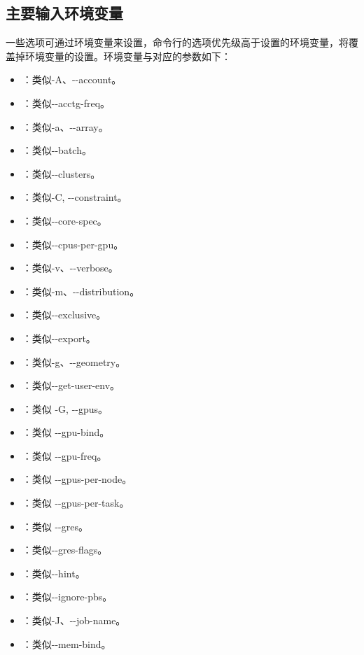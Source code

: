 \subsection{主要输入环境变量}
一些选项可通过环境变量来设置，命令行的选项优先级高于设置的环境变量，将覆盖掉环境变量的设置。环境变量与对应的参数如下：
\begin{itemize}
	\item {}：类似-A、-{}-account。
	\item {}：类似-{}-acctg-freq。
	\item {}：类似-a、-{}-array。
	\item {}：类似-{}-batch。
	\item {}：类似-{}-clusters。
	\item {}：类似-C, -{}-constraint。
	\item {}：类似-{}-core-spec。
	\item {}：类似-{}-cpus-per-gpu。
	\item {}：类似-v、-{}-verbose。
	\item {}：类似-m、-{}-distribution。
	\item {}：类似-{}-exclusive。
	\item {}：类似-{}-export。
	\item {}：类似-g、-{}-geometry。
	\item {}：类似-{}-get-user-env。
	\item {}：类似 -G, -{}-gpus。
	\item {}：类似 -{}-gpu-bind。
	\item {}：类似 -{}-gpu-freq。
	\item {}：类似 -{}-gpus-per-node。
	\item {}：类似 -{}-gpus-per-task。
	\item {}：类似 -{}-gres。
	\item {}：类似-{}-gres-flags。
	\item {}：类似-{}-hint。
	\item {}：类似-{}-ignore-pbs。
	\item {}：类似-J、-{}-job-name。
	\item {}：类似-{}-mem-bind。

\end{itemize}
